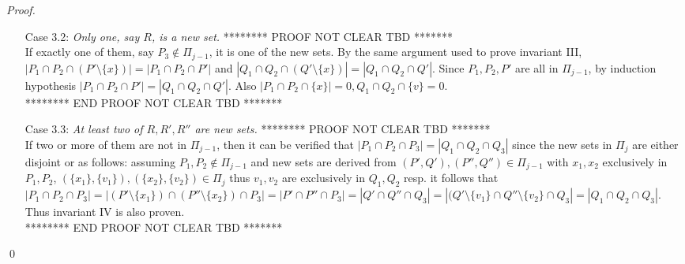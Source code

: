 \documentclass{llncs}
\begin{document}
\begin{proof}
\begin{enumerate}
\begin{enumerate}
    \item [Case 3.2:] {\em Only one, say $R$, is a new set.}
      ******** PROOF NOT CLEAR TBD *******\\  
      If exactly one of them, say $P_3 \notin \Pi_{j-1}$, it is one of the new sets. By the same argument used to
  prove invariant III, $|P_1 \cap P_2 \cap (P'
  \setminus \{x\})| = |P_1 \cap P_2 \cap P'|$ 
  and $|Q_1 \cap Q_2 \cap (Q' \setminus \{x\})| = |Q_1 \cap Q_2 \cap
  Q'|$. Since $P_1, P_2, P'$ are all in $\Pi_{j-1}$, by induction hypothesis
  $|P_1 \cap P_2 \cap P'| = |Q_1 \cap Q_2 \cap Q'|$. Also $|P_1 \cap
  P_2 \cap \{x\}| = 0, Q_1 \cap Q_2 \cap \{v\} = 0$. \\
  ******** END PROOF NOT CLEAR TBD *******


    \item [Case 3.3:] {\em At least two of $R, R', R''$ are new sets.}
      ******** PROOF NOT CLEAR TBD *******\\
      If two or more of them are not in $\Pi_{j-1}$, then it can
  be verified that $|P_1
  \cap P_2 \cap P_3| = |Q_1 \cap Q_2 \cap Q_3|$ since the new sets
  in $\Pi_j$ are either disjoint or as follows: assuming $P_1, P_2
  \notin \Pi_{j-1}$ and new sets are derived from $(P', Q'), (P'', Q'') \in
  \Pi_{j-1}$ with $x_1, x_2$
  exclusively in $P_1, P_2$, $(\{x_1\},\{v_1\}), (\{x_2\},\{v_2\})
  \in \Pi_j $ thus $v_1, v_2$ are exclusively in $Q_1, Q_2$ resp. it
  follows that
$|P_1
  \cap P_2 \cap P_3| = |(P' \setminus \{x_1\}) \cap (P'' \setminus
  \{x_2\}) \cap P_3| = |P' \cap P'' \cap P_3| = |Q' \cap Q'' \cap Q_3|
  = |(Q' \setminus \{v_1\} \cap Q'' \setminus \{v_2\} \cap Q_3| =
  |Q_1 \cap Q_2 \cap Q_3|$. Thus invariant
  IV is also proven.\\
  ******** END PROOF NOT CLEAR TBD *******
    \end{enumerate}
  \end{enumerate} \qed
\end{proof}
\end{document}
